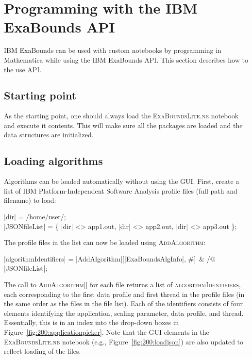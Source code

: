 \section{Programming with the IBM ExaBounds API}
\label{sec:300:notebook}

IBM ExaBounds can be used with custom notebooks by programming in Mathematica while using the IBM ExaBounds API. This section describes how to the use API.

\subsection{Starting point}

As the starting point, one should always load the \textsc{ExaBoundsLite.nb} notebook and execute it contents. This will make sure all the packages are loaded and the data structures are initialized.

\subsection{Loading algorithms}

Algorithms can be loaded automatically without using the GUI. First, create a list of IBM Platform-Independent Software Analysis profile files (full path and filename) to load:
\begin{mma}
	\In |dir| = /home/user/; \\
  \In |JSONfileList| = \{ \linebreak
    |dir| <> app1.out, \linebreak
    |dir| <> app2.out, \linebreak
    |dir| <> app3.out \linebreak
  \}; \\
\end{mma}

The profile files in the list can now be loaded using \textsc{AddAlgorithm}:
\begin{mma}
  \In |algorithmIdentifiers| = \linebreak |AddAlgorithm|[|ExaBoundsAlgInfo|, \#]~\& /@ |JSONfileList|; \\
\end{mma}

The call to \textsc{AddAlgorithm[]} for each file returns a list of \textsc{algorithmIdentifiers}, each corresponding to the first data profile and first thread in the profile files (in the same order as the files in the file list). Each of the identifiers consists of four elements identifying the application, scaling parameter, data profile, and thread. Essentially, this is in an index into the drop-down boxes in Figure~\ref{fig:200:applicationpicker}. Note that the GUI elements in the \textsc{ExaBoundsLite.nb} notebook (e.g., Figure~\ref{fig:200:loadjson}) are also updated to reflect loading of the files.

